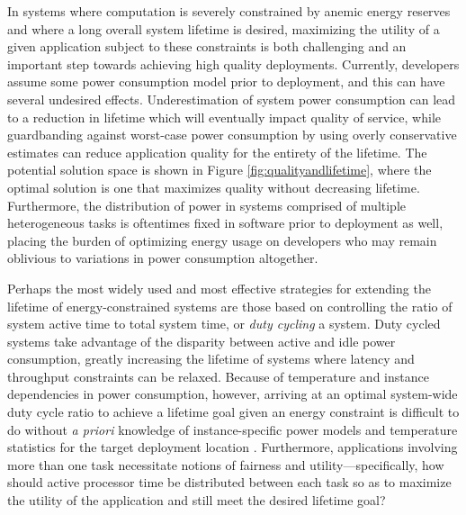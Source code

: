 In systems where computation is severely constrained by anemic energy reserves and where a long overall system lifetime is desired, maximizing the utility of a given application subject to these constraints is both challenging and an important step towards achieving high quality deployments.  Currently, developers assume some power consumption model prior to deployment, and this can have several undesired effects.  Underestimation of system power consumption can lead to a reduction in lifetime which will eventually impact quality of service, while guardbanding against worst-case power consumption by using overly conservative estimates can reduce application quality for the entirety of the lifetime. The potential solution space is shown in Figure \ref{fig:qualityandlifetime}, where the optimal solution is one that maximizes quality without decreasing lifetime. Furthermore, the distribution of power in systems comprised of multiple heterogeneous tasks is oftentimes fixed in software prior to deployment as well, placing the burden of optimizing energy usage on developers who may remain oblivious to variations in power consumption altogether. 


Perhaps the most widely used and most effective strategies for extending the lifetime of energy-constrained systems are those based on controlling the ratio of system active time to total system time, or \emph{duty cycling} a system.  Duty cycled systems take advantage of the disparity between active and idle power consumption, greatly increasing the lifetime of systems where latency and throughput constraints can be relaxed. Because of temperature and instance dependencies in power consumption, however, arriving at an optimal system-wide duty cycle ratio to achieve a lifetime goal given an energy constraint is difficult to do without \emph{a priori} knowledge of instance-specific power models and temperature statistics for the target deployment location \cite{Wanner:2012}. Furthermore, applications involving more than one task necessitate notions of fairness and utility---specifically, how should active processor time be distributed between each task so as to maximize the utility of the application and still meet the desired lifetime goal?

